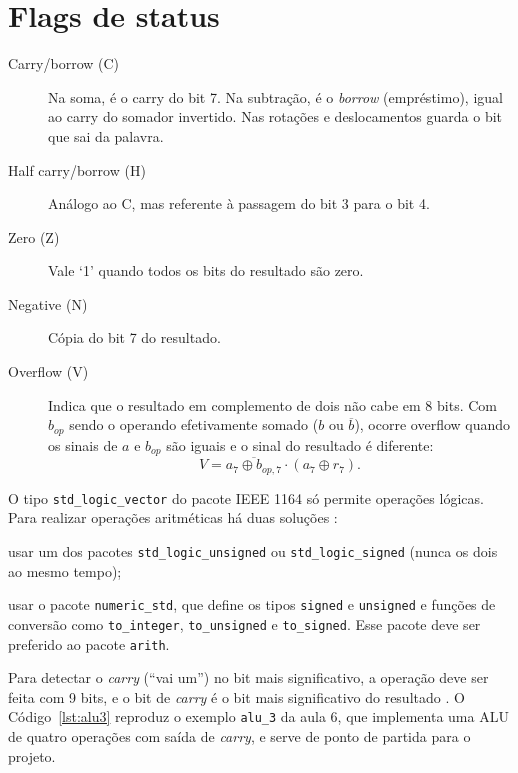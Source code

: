 \section{Flags de status}

\begin{description}
  \item[Carry/borrow (C)] Na soma, é o carry do bit 7. Na subtração, é o \textit{borrow} (empréstimo), igual ao carry do somador invertido. Nas rotações e deslocamentos guarda o bit que sai da palavra.
  \item[Half carry/borrow (H)] Análogo ao C, mas referente à passagem do bit 3 para o bit 4.
  \item[Zero (Z)] Vale `1' quando todos os bits do resultado são zero.
  \item[Negative (N)] Cópia do bit 7 do resultado.
  \item[Overflow (V)] Indica que o resultado em complemento de dois não cabe em 8 bits. Com $b_{op}$ sendo o operando efetivamente somado ($b$ ou $\overline{b}$), ocorre overflow quando os sinais de $a$ e $b_{op}$ são iguais e o sinal do resultado é diferente:
  \begin{equation}
    V = \overline{a_7 \oplus b_{op,7}} \cdot (a_7 \oplus r_7).
    \label{eq:ovf}
  \end{equation}
\end{description}


O tipo \texttt{std\_logic\_vector} do pacote IEEE 1164 só permite operações
lógicas. Para realizar operações aritméticas há duas soluções \cite{aula6}:

\begin{listar}
  \item usar um dos pacotes \texttt{std\_logic\_unsigned} ou
        \texttt{std\_logic\_signed} (nunca os dois ao mesmo tempo);
  \item usar o pacote \texttt{numeric\_std}, que define os tipos
        \texttt{signed} e \texttt{unsigned} e funções de conversão como
        \texttt{to\_integer}, \texttt{to\_unsigned} e \texttt{to\_signed}. Esse
        pacote deve ser preferido ao pacote \texttt{arith}.
\end{listar}

Para detectar o \emph{carry} (``vai um'') no bit mais significativo, a operação
deve ser feita com 9 bits, e o bit de \emph{carry} é o bit mais significativo
do resultado \cite{aula6}. O Código~\ref{lst:alu3} reproduz o exemplo
\texttt{alu\_3} da aula 6, que implementa uma ALU de quatro operações com saída
de \emph{carry}, e serve de ponto de partida para o projeto.

